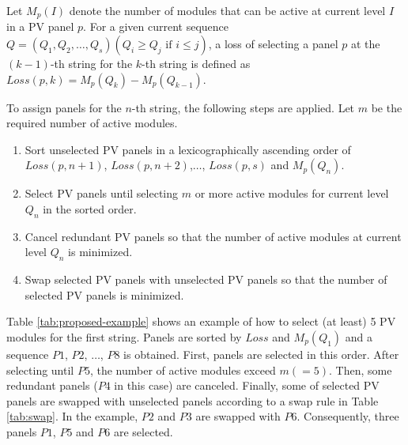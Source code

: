 \documentclass[conference]{IEEEtran}
\begin{document}
Let $M_{p}(I)$ denote the number of modules that can be active at current level $I$ in a PV panel $p$. 
For a given current sequence $Q = (Q_{1},Q_{2},\ldots ,Q_{s}) (Q_{i} \geq Q_{j} \mbox{\ if\ } i \leq j)$, 
a loss of selecting a panel $p$ at the $(k-1)$-th string for the $k$-th string is defined as 
$Loss(p,k) = M_{p}(Q_{k}) - M_{p}(Q_{k-1})$. 

%

To assign panels for the $n$-th string, the following steps are applied. Let $m$ be the required number of active modules.
\begin{enumerate}
\item Sort unselected PV panels in a lexicographically ascending order of $Loss(p,n+1)$, $Loss(p,n+2)$,$\ldots$, $Loss(p,s)$ and $M_{p}(Q_{n})$.
\item Select PV panels until selecting $m$ or more active modules for current level $Q_{n}$ in the sorted order.
\item Cancel redundant PV panels so that the number of active modules at current level $Q_{n}$ is minimized.
\item Swap selected PV panels with unselected PV panels so that the number of selected PV panels is minimized.
\end{enumerate}

Table \ref{tab:proposed-example} shows an example of how to select (at least) 5 PV modules for the first string. 
Panels are sorted by $Loss$ and $M_{p}(Q_{1})$ and a sequence $P1$, $P2$, $\ldots$, $P8$ is obtained. 
First, panels are selected in this order. After selecting until $P5$, the number of active modules exceed $m (=5)$. Then, some redundant panels ($P4$ in this case) are canceled. Finally, some of selected PV panels are swapped with unselected panels according to a swap rule in Table \ref{tab:swap}. In the example, $P2$ and $P3$ are swapped with $P6$. Consequently, three panels $P1$, $P5$ and $P6$ are selected. 
\end{document}
